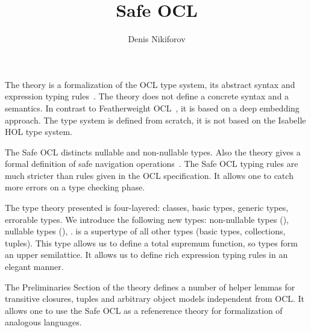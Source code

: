 \documentclass[11pt,a4paper]{book}
\makeatletter
\newenvironment{abstract}{%
  \small
  \begin{center}%
    {\bfseries \abstractname\vspace{-.5em}\vspace{\z@}}%
  \end{center}%
  \quotation}{\endquotation}
\makeatother
\begin{document}
\title{Safe OCL}
\author{Denis Nikiforov}
\maketitle

\begin{abstract}
  The theory is a formalization of the OCL type system,
  its abstract syntax and expression typing rules~\cite{OCL24}.
  The theory does not define a concrete syntax and a semantics.
  In contrast to Featherweight OCL~\cite{Featherweight_OCL-AFP},
  it is based on a deep embedding approach. The type system is defined
  from scratch, it is not based on the Isabelle HOL type system.

  The Safe OCL distincts nullable and non-nullable types. Also
  the theory gives a formal definition of safe navigation
  operations~\cite{DBLP:conf/models/Willink15}. The Safe OCL typing rules
  are much stricter than rules given in the OCL specification.
  It allows one to catch more errors on a type checking phase.

  The type theory presented is four-layered: classes, basic types,
  generic types, errorable types. We introduce the following new types:
  non-nullable types (),
  nullable types (\isa{{\isasymtau}{\isacharbrackleft}{\isacharquery}{\isacharbrackright}}),
  .  is a supertype of all other types
  (basic types, collections, tuples). This type allows us to define
  a total supremum function, so types form an upper semilattice.
  It allows us to define rich expression typing rules in an elegant manner.

  The Preliminaries Section of the theory defines a number of
  helper lemmas for transitive closures, tuples and arbitrary
  object models independent from OCL. It allows one to use
  the Safe OCL as a refenerence theory for formalization of
  analogous languages.
\end{abstract}

\tableofcontents





\end{document}
